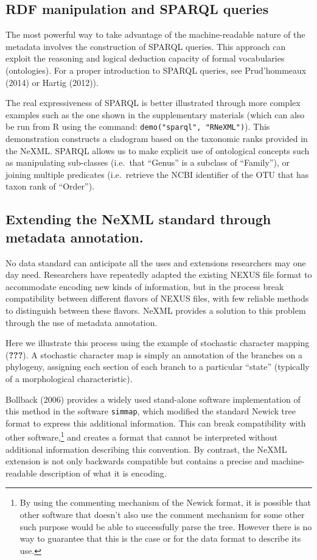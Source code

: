 \documentclass[author-year, review, 11pt]{components/elsarticle} %
\begin{document}
\subsection{RDF manipulation and SPARQL
queries}\label{rdf-manipulation-and-sparql-queries}

The most powerful way to take advantage of the machine-readable nature
of the metadata involves the construction of SPARQL queries. This
approach can exploit the reasoning and logical deduction capacity of
formal vocabularies (ontologies). For a proper introduction to SPARQL
queries, see Prud'hommeaux (2014) or Hartig (2012)).

The real expressiveness of SPARQL is better illustrated through more
complex examples such as the one shown in the supplementary materials
(which can also be run from R using the command:
\texttt{demo("sparql", "RNeXML")}). This demonstration constructs a
cladogram based on the taxonomic ranks provided in the NeXML. SPARQL
allows us to make explicit use of ontological concepts such as
manipulating sub-classes (i.e.~that ``Genus'' is a subclass of
``Family''), or joining multiple predicates (i.e.~retrieve the NCBI
identifier of the OTU that has taxon rank of ``Order'').

\subsection{Extending the NeXML standard through metadata
annotation.}\label{extending-the-nexml-standard-through-metadata-annotation.}

No data standard can anticipate all the uses and extensions researchers
may one day need. Researchers have repeatedly adapted the existing NEXUS
file format to accommodate encoding new kinds of information, but in the
process break compatibility between different flavors of NEXUS files,
with few reliable methods to distinguish between these flavors. NeXML
provides a solution to this problem through the use of metadata
annotation.

Here we illustrate this process using the example of stochastic
character mapping ({\textbf{???}}). A stochastic character map is simply
an annotation of the branches on a phylogeny, assigning each section of
each branch to a particular ``state'' (typically of a morphological
characteristic).

Bollback (2006) provides a widely used stand-alone software
implementation of this method in the software \texttt{simmap}, which
modified the standard Newick tree format to express this additional
information. This can break compatibility with other software,\footnote{By
  using the commenting mechanism of the Newick format, it is possible
  that other software that doesn't also use the comment mechanism for
  some other such purpose would be able to successfully parse the tree.
  However there is no way to guarantee that this is the case or for the
  data format to describe its use.} and creates a format that cannot be
interpreted without additional information describing this convention.
By contrast, the NeXML extension is not only backwards compatible but
contains a precise and machine-readable description of what it is
encoding.
\end{document}
